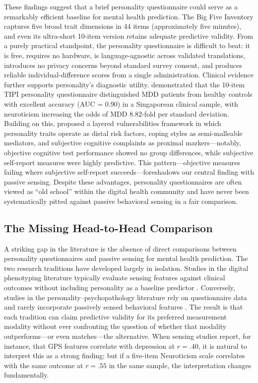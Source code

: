 \documentclass[12pt, a4paper]{article}
\begin{document}
These findings suggest that a brief personality questionnaire could serve as a remarkably efficient baseline for mental health prediction. The Big Five Inventory \citep[BFI;][]{john1999big} captures five broad trait dimensions in 44 items (approximately five minutes), and even its ultra-short 10-item version \citep[BFI-10;][]{rammstedt2007measuring} retains adequate predictive validity. From a purely practical standpoint, the personality questionnaire is difficult to beat: it is free, requires no hardware, is language-agnostic across validated translations, introduces no privacy concerns beyond standard survey consent, and produces reliable individual-difference scores from a single administration. Clinical evidence further supports personality's diagnostic utility. \citet{ho2022diagnostic} demonstrated that the 10-item TIPI personality questionnaire distinguished MDD patients from healthy controls with excellent accuracy (AUC = 0.90) in a Singaporean clinical sample, with neuroticism increasing the odds of MDD 8.82-fold per standard deviation. Building on this, \citet{tay2026layered} proposed a layered vulnerabilities framework in which personality traits operate as distal risk factors, coping styles as semi-malleable mediators, and subjective cognitive complaints as proximal markers---notably, objective cognitive test performance showed no group differences, while subjective self-report measures were highly predictive. This pattern---objective measures failing where subjective self-report succeeds---foreshadows our central finding with passive sensing. Despite these advantages, personality questionnaires are often viewed as ``old school'' within the digital health community and have never been systematically pitted against passive behavioral sensing in a fair comparison.

\subsection{The Missing Head-to-Head Comparison}

A striking gap in the literature is the absence of direct comparisons between personality questionnaires and passive sensing for mental health prediction. The two research traditions have developed largely in isolation. Studies in the digital phenotyping literature typically evaluate sensing features against clinical outcomes without including personality as a baseline predictor \citep{chikersal2021detecting, wang2018sensing, saeb2015mobile}. Conversely, studies in the personality--psychopathology literature rely on questionnaire data and rarely incorporate passively sensed behavioral features \citep{kotov2010linking, lahey2009public}. The result is that each tradition can claim predictive validity for its preferred measurement modality without ever confronting the question of whether that modality outperforms---or even matches---the alternative. When sensing studies report, for instance, that GPS features correlate with depression at $r = .40$, it is natural to interpret this as a strong finding; but if a five-item Neuroticism scale correlates with the same outcome at $r = .55$ in the same sample, the interpretation changes fundamentally.
\end{document}

